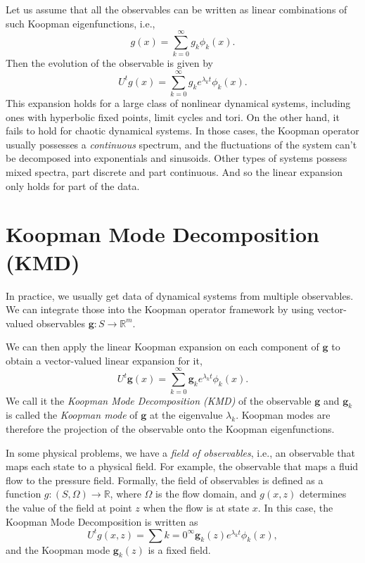 \documentclass{article}
\def\R{\mathbb{R}}
\def\g{\mathbf{g}}
\begin{document}
Let us assume that all the observables can be written as linear combinations of
such Koopman eigenfunctions, i.e.,
\begin{equation}
    g(x) = \sum_{k=0}^{\infty}g_k \phi_k(x).
\end{equation}
Then the evolution of the observable is given by
\begin{equation}
    U^t g(x) = \sum_{k=0}^{\infty}g_k e^{\lambda_k t} \phi_k(x).
\end{equation}
This expansion holds for a large class of nonlinear dynamical systems,
including ones with hyperbolic fixed points, limit cycles and tori.
On the other hand, it fails to hold for chaotic dynamical systems.
In those cases, the Koopman operator usually possesses a \textit{continuous}
spectrum, and the fluctuations of the system can't be decomposed into
exponentials and sinusoids.
Other types of systems possess mixed spectra, part discrete and part continuous.
And so the linear expansion only holds for part of the data.

\section{Koopman Mode Decomposition (KMD)}%
\label{sec:koopman_mode_decomposition_kmd_}

In practice, we usually get data of dynamical systems from multiple
observables.
We can integrate those into the Koopman operator framework by using
vector-valued observables $\g:S\to \R^m$.

We can then apply the linear Koopman expansion on each component of $\g$
to obtain a vector-valued linear expansion for it,
\begin{equation}
    U^t \g(x) = \sum_{k=0}^{\infty} \g_k e^{\lambda_k t}\phi_k(x).
\end{equation}
We call it the \textit{Koopman Mode Decomposition (KMD)} of the observable $\g$
and $\g_k$ is called the \textit{Koopman mode} of $\g$ at the eigenvalue
$\lambda_k$.
Koopman modes are therefore the projection of the observable onto the Koopman
eigenfunctions.

In some physical problems, we have a \textit{field of observables}, i.e., an
observable that maps each state to a physical field.
For example, the observable that maps a fluid flow to the pressure field.
Formally, the field of observables is defined as a function $g:(S, \Omega)\to
\R$, where $\Omega$ is the flow domain, and $g(x,z)$ determines the value of
the field at point $z$ when the flow is at state $x$.
In this case, the Koopman Mode Decomposition is written as
\begin{equation}
    U^t g(x, z) = \sum{k=0}^{\infty} \g_k(z) e^{\lambda_k t}\phi_k(x),
\end{equation}
and the Koopman mode $\g_k(z)$ is a fixed field.
\end{document}
